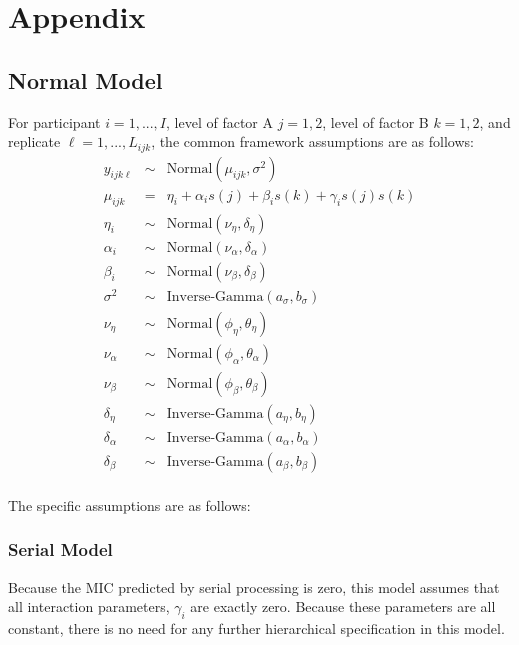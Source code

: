 \section{Appendix}

\subsection{Normal Model}

For participant $i = 1,...,I$, level of factor A $j = 1,2$,
level of factor B $k = 1,2$, and replicate $\ell =
1,...,L_{ijk}$, the common framework assumptions are as follows:\\
\begin{eqnarray*}
y_{ijk\ell} &\sim& \mbox{Normal}\left(\mu_{ijk},\sigma^2\right)\\
\mu_{ijk} &=& \eta_i + \alpha_is(j) + \beta_is(k) + \gamma_is(j)s(k)\\
\eta_i &\sim& \mbox{Normal}\left(\nu_{\eta},\delta_{\eta}\right)\\
\alpha_i &\sim& \mbox{Normal}\left(\nu_{\alpha},\delta_{\alpha}\right)\\
\beta_i &\sim& \mbox{Normal}\left(\nu_{\beta},\delta_{\beta}\right)\\
\sigma^2 &\sim& \mbox{Inverse-Gamma}\left(a_{\sigma},b_{\sigma}\right)\\
\nu_{\eta} &\sim& \mbox{Normal}\left(\phi_{\eta},\theta_{\eta}\right)\\
\nu_{\alpha} &\sim& \mbox{Normal}\left(\phi_{\alpha},\theta_{\alpha}\right)\\
\nu_{\beta} &\sim& \mbox{Normal}\left(\phi_{\beta},\theta_{\beta}\right)\\
\delta_{\eta} &\sim& \mbox{Inverse-Gamma}\left(a_{\eta},b_{\eta}\right)\\
\delta_{\alpha} &\sim& \mbox{Inverse-Gamma}\left(a_{\alpha},b_{\alpha}\right)\\
\delta_{\beta} &\sim& \mbox{Inverse-Gamma}\left(a_{\beta},b_{\beta}\right)\\
\end{eqnarray*}

The specific assumptions are as follows:

\subsubsection{Serial Model}
Because the MIC predicted by serial processing is zero, this model
assumes that all interaction parameters, $\gamma_i$ are exactly zero.
Because these parameters are all constant, there is no need for any
further hierarchical specification in this model.

